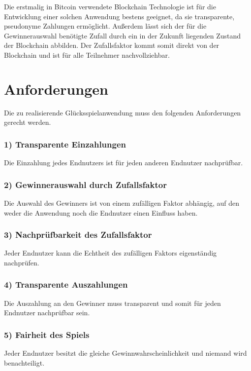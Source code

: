 \noindent Die erstmalig in Bitcoin verwendete Blockchain Technologie ist für die Entwicklung einer solchen Anwendung bestens geeignet, da sie transparente, pseudonyme Zahlungen ermöglicht. Außerdem lässt sich der für die Gewinnerauswahl benötigte Zufall durch ein in der Zukunft liegenden Zustand der Blockchain abbilden. 
Der Zufallsfaktor kommt somit direkt von der Blockchain und ist für alle Teilnehmer nachvollziehbar.



\section{Anforderungen}\label{anforderungen}
Die zu realisierende Glücksspielanwendung muss den folgenden Anforderungen gerecht werden.
\subsubsection{1) Transparente Einzahlungen}
Die Einzahlung jedes Endnutzers ist für jeden anderen Endnutzer nachprüfbar.
\subsubsection{2) Gewinnerauswahl durch Zufallsfaktor}
Die Auswahl des Gewinners ist von einem zufälligen Faktor abhängig, auf den weder die Anwendung noch die Endnutzer einen Einfluss haben.
\subsubsection{3) Nachprüfbarkeit des Zufallsfaktor}
Jeder Endnutzer kann die Echtheit des zufälligen Faktors eigenständig nachprüfen.
\subsubsection{4) Transparente Auszahlungen}
Die Auszahlung an den Gewinner muss transparent und somit für jeden Endnutzer nachprüfbar sein.
\subsubsection{5) Fairheit des Spiels}
Jeder Endnutzer besitzt die gleiche Gewinnwahrscheinlichkeit und niemand wird benachteiligt.

